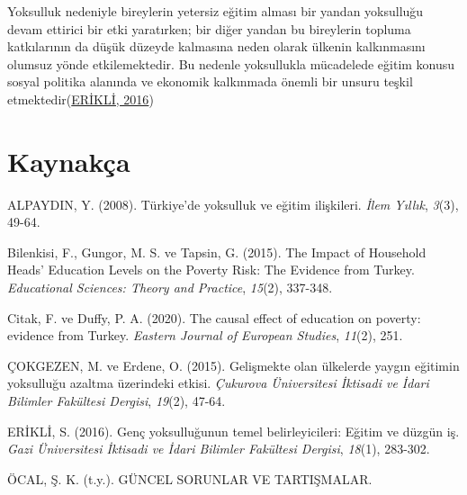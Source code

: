 \documentclass[
  12pt,
]{article}
\newlength{\cslhangindent}
\newlength{\cslentryspacingunit} %
\newenvironment{CSLReferences}[2] %
 {%
  \setlength{\parindent}{0pt}
  \ifodd #1
  \let\oldpar\par
  \def\par{\hangindent=\cslhangindent\oldpar}
  \fi
  \setlength{\parskip}{#2\cslentryspacingunit}
 }%
 {}
\begin{document}
Yoksulluk nedeniyle bireylerin yetersiz eğitim alması bir yandan yoksulluğu devam ettirici bir etki yaratırken; bir diğer yandan bu bireylerin topluma katkılarının da düşük düzeyde kalmasına neden olarak ülkenin kalkınmasını olumsuz yönde etkilemektedir. Bu nedenle yoksullukla mücadelede eğitim konusu sosyal politika alanında ve ekonomik kalkınmada önemli bir unsuru teşkil etmektedir(\protect\hyperlink{ref-erikli2016gencc}{ERİKLİ, 2016})

\newpage

\hypertarget{references}{%
\section{Kaynakça}\label{references}}

\hypertarget{refs}{}
\begin{CSLReferences}{1}{0}
\leavevmode{}%
ALPAYDIN, Y. (2008). T{ü}rkiye'de yoksulluk ve e{ğ}itim ili{ş}kileri. \emph{{İ}lem Y{ı}ll{ı}k}, \emph{3}(3), 49-64.

\leavevmode{}%
Bilenkisi, F., Gungor, M. S. ve Tapsin, G. (2015). The Impact of Household Heads' Education Levels on the Poverty Risk: The Evidence from Turkey. \emph{Educational Sciences: Theory and Practice}, \emph{15}(2), 337-348.

\leavevmode{}%
Citak, F. ve Duffy, P. A. (2020). The causal effect of education on poverty: evidence from Turkey. \emph{Eastern Journal of European Studies}, \emph{11}(2), 251.

\leavevmode{}%
ÇOKGEZEN, M. ve Erdene, O. (2015). Geli{ş}mekte olan {ü}lkelerde yayg{ı}n e{ğ}itimin yoksullu{ğ}u azaltma {ü}zerindeki etkisi. \emph{{Ç}ukurova {Ü}niversitesi {İ}ktisadi ve {İ}dari Bilimler Fak{ü}ltesi Dergisi}, \emph{19}(2), 47-64.

\leavevmode{}%
ERİKLİ, S. (2016). Gen{ç} yoksullu{ğ}unun temel belirleyicileri: E{ğ}itim ve d{ü}zg{ü}n i{ş}. \emph{Gazi {Ü}niversitesi {İ}ktisadi ve {İ}dari Bilimler Fak{ü}ltesi Dergisi}, \emph{18}(1), 283-302.

\leavevmode{}%
ÖCAL, Ş. K. (t.y.). G{Ü}NCEL SORUNLAR VE TARTI{Ş}MALAR.

\end{CSLReferences}
\end{document}
